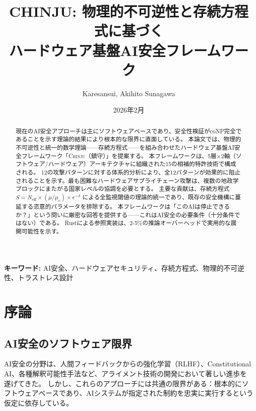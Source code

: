 \documentclass[11pt,a4paper]{article}
\title{\textbf{CHINJU: 物理的不可逆性と存続方程式に基づく\\ハードウェア基盤AI安全フレームワーク}}
\author{
  Karesansui, Akihito Sunagawa
}
\date{2026年2月}
\newcommand{\chinju}{\textsc{Chinju}}
\newcommand{\Neff}{N_{\text{eff}}}
\newcommand{\muc}{\mu_c}
\begin{document}
\maketitle

\begin{abstract}
現在のAI安全アプローチは主にソフトウェアベースであり、安全性検証がcoNP完全であることを示す理論的結果により根本的な限界に直面している。
本論文では、物理的不可逆性と統一的数学理論——存続方程式——を組み合わせたハードウェア基盤AI安全フレームワーク「\chinju{}（鎮守）」を提案する。
本フレームワークは、5層×2軸（ソフトウェア/ハードウェア）アーキテクチャに組織された15の相補的特許技術で構成される。
12の攻撃パターンに対する体系的分析により、全12パターンが効果的に阻止されることを示す。最も困難なハードウェアサプライチェーン攻撃は、複数の地政学ブロックにまたがる国家レベルの協調を必要とする。
主要な貢献は、存続方程式 $S = \Neff \times (\mu/\muc) \times e^{-\delta}$ による全監視閾値の理論的統一であり、既存の安全機構に蔓延する恣意的パラメータを排除する。
本フレームワークは「このAIは停止できるか？」という問いに厳密な回答を提供する——これはAI安全の必要条件（十分条件ではない）である。
Rustによる参照実装は、2-5\%の推論オーバーヘッドで実用的な展開可能性を示す。
\end{abstract}

\textbf{キーワード:} AI安全、ハードウェアセキュリティ、存続方程式、物理的不可逆性、トラストレス設計

\section{序論}
\label{sec:intro}

\subsection{AI安全のソフトウェア限界}

AI安全の分野は、人間フィードバックからの強化学習（RLHF）、Constitutional AI、各種解釈可能性手法など、アライメント技術の開発において著しい進歩を遂げてきた。
しかし、これらのアプローチには共通の限界がある：根本的にソフトウェアベースであり、AIシステムが指定された制約を忠実に実行するという仮定に依存している。
\end{document}
